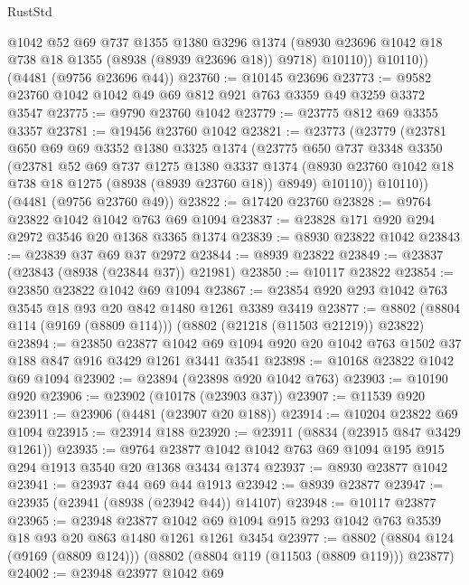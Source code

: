 \begin{lexlean}{RustStd}
\begin{coremodule}
            @1042
            @52
            @69
            @737
            @1355
            @1380
            @3296
            @1374
            (@8930 @23696 @1042 @18 @738 @18 @1355 (@8938 (@8939 @23696 @18)) @9718)
            @10110))
        @10110))
    (@4481 (@9756 @23696 @44))
@23760 := @10145 @23696
@23773 := @9582 @23760 @1042 @1042 @49 @69 @812 @921 @763 @3359 @49 @3259 @3372 @3547
@23775 := @9790 @23760 @1042
@23779 := @23775 @812 @69 @3355 @3357
@23781 := @19456 @23760 @1042
@23821 := @23773
    (@23779
      (@23781
        @650
        @69
        @69
        @3352
        @1380
        @3325
        @1374
        (@23775
          @650
          @737
          @3348
          @3350
          (@23781
            @52
            @69
            @737
            @1275
            @1380
            @3337
            @1374
            (@8930 @23760 @1042 @18 @738 @18 @1275 (@8938 (@8939 @23760 @18)) @8949)
            @10110))
        @10110))
    (@4481 (@9756 @23760 @49))
@23822 := @17420 @23760
@23828 := @9764 @23822 @1042 @1042 @763 @69 @1094
@23837 := @23828 @171 @920 @294 @2972 @3546 @20 @1368 @3365 @1374
@23839 := @8930 @23822 @1042
@23843 := @23839 @37 @69 @37 @2972
@23844 := @8939 @23822
@23849 := @23837 (@23843 (@8938 (@23844 @37)) @21981)
@23850 := @10117 @23822
@23854 := @23850 @23822 @1042 @69 @1094
@23867 := @23854 @920 @293 @1042 @763 @3545 @18 @93 @20 @842 @1480 @1261 @3389 @3419
@23877 := @8802 (@8804 @114 (@9169 (@8809 @114))) (@8802 (@21218 (@11503 @21219)) @23822)
@23894 := @23850
    @23877
    @1042
    @69
    @1094
    @920
    @20
    @1042
    @763
    @1502
    @37
    @188
    @847
    @916
    @3429
    @1261
    @3441
    @3541
@23898 := @10168 @23822 @1042 @69 @1094
@23902 := @23894 (@23898 @920 @1042 @763)
@23903 := @10190 @920
@23906 := @23902 (@10178 (@23903 @37))
@23907 := @11539 @920
@23911 := @23906 (@4481 (@23907 @20 @188))
@23914 := @10204 @23822 @69 @1094
@23915 := @23914 @188
@23920 := @23911 (@8834 (@23915 @847 @3429 @1261))
@23935 := @9764 @23877 @1042 @1042 @763 @69 @1094 @195 @915 @294 @1913 @3540 @20 @1368 @3434 @1374
@23937 := @8930 @23877 @1042
@23941 := @23937 @44 @69 @44 @1913
@23942 := @8939 @23877
@23947 := @23935 (@23941 (@8938 (@23942 @44)) @14107)
@23948 := @10117 @23877
@23965 := @23948
    @23877
    @1042
    @69
    @1094
    @915
    @293
    @1042
    @763
    @3539
    @18
    @93
    @20
    @863
    @1480
    @1261
    @1261
    @3454
@23977 := @8802 (@8804 @124 (@9169 (@8809 @124))) (@8802 (@8804 @119 (@11503 (@8809 @119))) @23877)
@24002 := @23948
    @23977
    @1042
    @69

\end{coremodule}
\end{lexlean}
